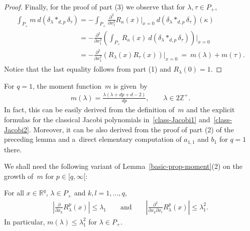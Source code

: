 \begin{proof}
Finally, for the proof of part (3) we observe that for $\lambda,\tau\in P_+$,
\begin{gather*}
\int_{P_+} m\> d(\delta_\lambda*_{d,p}\delta_\tau)
=-\int_{P_+} \frac{\partial^2}{\partial x_1^2}R_\kappa(x)\bigg|_{x=0} \> d(\delta_\lambda*_{d,p}\delta_\tau)(\kappa)
\\
\phantom{\int_{P_+} m\> d(\delta_\lambda*_{d,p}\delta_\tau)}
=-\frac{\partial^2}{\partial x_1^2}\left(\int_{P_+} R_\kappa(x)\>d(\delta_\lambda*_{d,p}\delta_\tau)\right)\bigg|_{x=0}
\\
\phantom{\int_{P_+} m\> d(\delta_\lambda*_{d,p}\delta_\tau)}
=-\frac{\partial^2}{\partial x_1^2}\left(R_\lambda(x)R_\tau(x)\right)\bigg|_{x=0} \>=\> m(\lambda)+m(\tau).
\end{gather*}
Notice that the last equality follows from part (1) and $R_\lambda(0)=1$.
\end{proof}

\begin{Example}
 For $q=1$, the moment function~$m$ is given~by
\begin{gather*}
m(\lambda)= \frac{\lambda(\lambda+dp+d-2)}{dp},
\qquad
\lambda\in 2\mathbb Z^+.
\end{gather*}
In fact, this can be easily derived from the def\/inition of~$m$ and the explicit formulas for the classical Jacobi
polynomials in~\eqref{class-Jacobi1} and~\eqref{class-Jacobi2}.
Moreover, it can be also derived from the proof of part (2) of the preceding lemma and a~direct elementary computation
of $a_{1,1}$ and $b_1$ for $q=1$ there.
\end{Example}

We shall need the following variant of Lemma~\ref{basic-prop-moment}(2) on the growth of~$m$ for $p\in[q,\infty[$:

\begin{Lemma}
\label{quad-wachstum-oben}
For all $x\in\mathbb R^q$, $\lambda\in P_+$ and $k,l=1,\ldots,q$,
\begin{gather*}
\left|\frac{\partial}{\partial x_k} R_\lambda^p(x)\right|\leq \lambda_1
\qquad
\text{and}
\qquad
\left|\frac{\partial^2}{\partial x_k\partial x_l} R_\lambda^p(x)\right|\leq \lambda_1^2.
\end{gather*}
In particular, $m(\lambda)\leq \lambda_1^2$ for $\lambda\in P_+$.
\end{Lemma}

